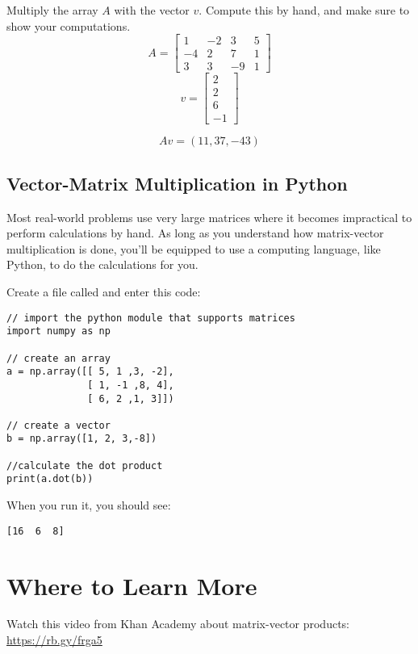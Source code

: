\begin{Exercise}[title={Vector Matrix Multiplication}, label=vector-matrix-multiply01]
Multiply the array $A$ with the vector $v$. Compute this by hand, and make sure to show your computations. 
$$A = \begin{bmatrix}
 1 &-2  &3 &5  \\
 -4  &2  &7 &1 \\
 3  &3  &-9 &1
\end{bmatrix}$$
	$$v = 
	\begin{bmatrix}
		2 \\
 		2 \\
 		6 \\
 		-1
	\end{bmatrix}$$
\end{Exercise}
\begin{Answer}[ref=vector-matrix-multiply01]
$$Av = (11, 37, -43)$$
\end{Answer}

\subsection{Vector-Matrix Multiplication in Python}
Most real-world problems use very large matrices where it becomes impractical to perform calculations by hand. As long as you understand how matrix-vector multiplication is done, you'll be equipped to use a computing language, like Python, to do the calculations for you. 

Create a file called  and enter this code:

\begin{Verbatim}
// import the python module that supports matrices
import numpy as np

// create an array
a = np.array([[ 5, 1 ,3, -2], 
              [ 1, -1 ,8, 4], 
              [ 6, 2 ,1, 3]])

// create a vector 
b = np.array([1, 2, 3,-8])

//calculate the dot product
print(a.dot(b))
\end{Verbatim}

When you run it, you should see:
\begin{Verbatim}
[16  6  8]
\end{Verbatim}

\section{Where to Learn More}
Watch this video from Khan Academy about matrix-vector products: \url{https://rb.gy/frga5}

